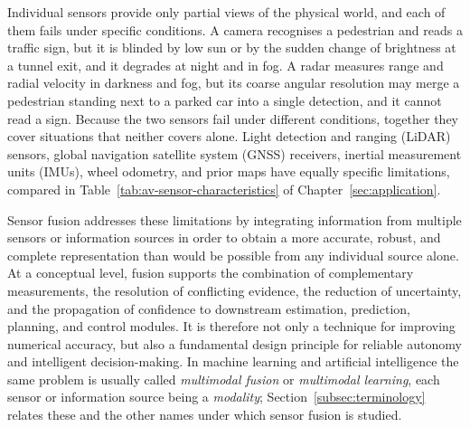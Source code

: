 Individual sensors provide only partial views of the physical world, and each of them fails under specific conditions. A camera recognises a pedestrian and reads a traffic sign, but it is blinded by low sun or by the sudden change of brightness at a tunnel exit, and it degrades at night and in fog. A radar measures range and radial velocity in darkness and fog, but its coarse angular resolution may merge a pedestrian standing next to a parked car into a single detection, and it cannot read a sign. Because the two sensors fail under different conditions, together they cover situations that neither covers alone. Light detection and ranging (LiDAR) sensors, global navigation satellite system (GNSS) receivers, inertial measurement units (IMUs), wheel odometry, and prior maps have equally specific limitations, compared in Table~\ref{tab:av-sensor-characteristics} of Chapter~\ref{sec:application}.

Sensor fusion addresses these limitations by integrating information from multiple sensors or information sources in order to obtain a more accurate, robust, and complete representation than would be possible from any individual source alone. At a conceptual level, fusion supports the combination of complementary measurements, the resolution of conflicting evidence, the reduction of uncertainty, and the propagation of confidence to downstream estimation, prediction, planning, and control modules. It is therefore not only a technique for improving numerical accuracy, but also a fundamental design principle for reliable autonomy and intelligent decision-making. In machine learning and artificial intelligence the same problem is usually called \emph{multimodal fusion} or \emph{multimodal learning}, each sensor or information source being a \emph{modality}; Section~\ref{subsec:terminology} relates these and the other names under which sensor fusion is studied.

